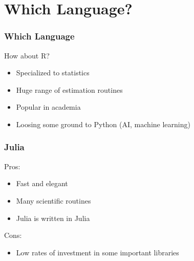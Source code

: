 \documentclass[
    xcolor={svgnames,dvipsnames},
    hyperref={colorlinks, citecolor=DeepPink4, linkcolor=DarkRed, urlcolor=DarkBlue}
    ]{beamer}  %
\newcommand{\1}{\mathbbm 1}
\begin{document}
\section{Which Language?}


\begin{frame}
    \frametitle{Which Language}


    How about R?
    \vspace{0.5em}

    \begin{itemize}
        \item Specialized to statistics
            \vspace{0.5em}
        \item Huge range of estimation routines
            \vspace{0.5em}
        \item Popular in academia 
            \vspace{0.5em}
        \item Loosing some ground to Python (AI, machine learning)
    \end{itemize}

\end{frame}


\begin{frame}
    \frametitle{Julia}

    Pros:
    
    \begin{itemize}
        \item Fast and elegant
            \vspace{0.5em}
        \item Many scientific routines
            \vspace{0.5em}
        \item Julia is written in Julia
    \end{itemize}

            \vspace{0.5em}
            \vspace{0.5em}
            \vspace{0.5em}
    Cons:
    
    \begin{itemize}
        \item Low rates of investment in some important libraries
    \end{itemize}

\end{frame}
\end{document}
